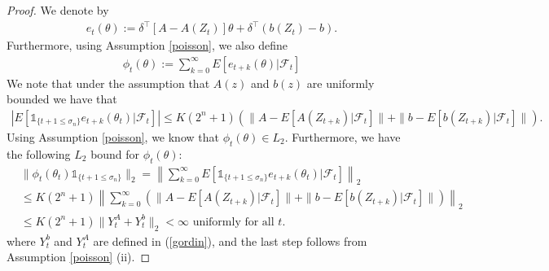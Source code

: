 \documentclass[11pt]{article}
\begin{document}
\begin{proof}
 We denote by
 \begin{align*}
 e_t(\theta):= \delta^\intercal\left[ A- A(Z_t)\right]\theta + \delta^\intercal\left(b(Z_t)-b\right).
 \end{align*}
 Furthermore, using Assumption \ref{poisson}, we also define
 \begin{align*}
 \phi_t(\theta):=\sum_{k=0}^\infty E\left[e_{t+k}(\theta)|\mathcal{F}_t\right]
 \end{align*}
 We note that under the assumption that $A(z)$ and $b(z)$ are uniformly bounded we have that
 \begin{align*}
 \left| E[\mathds{1}_{\{t+1\leq \sigma_n\}} e_{t+k}(\theta_t)|\mathcal{F}_t] \right| \leq K (2^n+1) \left(\| A- E[A(Z_{t+k})|\mathcal{F}_t]\| +\| b- E[b(Z_{t+k})|\mathcal{F}_t]\|   \right).
 \end{align*}
Using Assumption \ref{poisson}, we know that $\phi_t(\theta)\in L_2$.  Furthermore, we have the following  $L_2$ bound for $\phi_t(\theta)$:
 \begin{align}\label{l2_bound_phi}
 &\|\phi_t(\theta_t)\mathds{1}_{\{t+1\leq \sigma_n\}}\|_2 =  \left\| \sum_{k=0}^\infty E[\mathds{1}_{\{t+1\leq \sigma_n\}} e_{t+k}(\theta_t)|\mathcal{F}_t] \right\|_2\nonumber\\
 &\leq K (2^n+1) \left\| \sum_{k=0}^\infty  \left(\| A- E[A(Z_{t+k})|\mathcal{F}_t]\| +\| b- E[b(Z_{t+k})|\mathcal{F}_t]\|   \right)  \right\|_2\nonumber\\
 &\leq  K (2^n+1) \| Y_t^A + Y_t^b\|_2 < \infty \text{ uniformly for all } t. 
 \end{align}
 where $Y_t^b$ and $Y_t^A$ are defined in (\ref{gordin}), and the last step follows from Assumption \ref{poisson} (ii). 







 
 

\end{proof}
\end{document}
